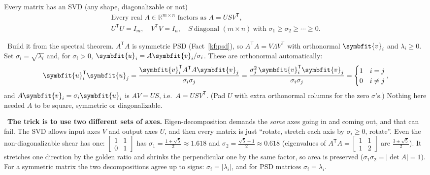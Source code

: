 \documentclass[11pt]{article}
\newcommand{\bm}[1]{\symbfit{#1}}
\newcounter{keyfact}
\newcommand{\why}{\par\smallskip{\color{intgreen}\textbf{Why.}}\ }
\newcommand{\sowhat}{\par\smallskip{\color{corpurple}\textbf{So what.}}\ }
\newcommand{\R}{\mathbb{R}}
\newcommand{\T}{^{\mathsf T}}
\begin{document}
\begin{keyfactbox}{Every matrix has an SVD (any shape, diagonalizable or not)}\label{kf:svdexists}
\[
\boxed{\begin{gathered}
\text{Every real } A\in\R^{m\times n}\text{ factors as } A=USV\T,\\
U\T U=I_m,\quad V\T V=I_n,\quad S\ \text{diagonal } (m\times n)\ \text{with }\sigma_1\ge\sigma_2\ge\cdots\ge0.
\end{gathered}}
\]
\why Build it from the spectral theorem. $A\T A$ is symmetric PSD (Fact~\ref{kf:psd}), so $A\T A=V\Lambda V\T$ with
orthonormal $\bm v_i$ and $\lambda_i\ge0$. Set $\sigma_i=\sqrt{\lambda_i}$ and, for $\sigma_i>0$, $\bm u_i=A\bm v_i/\sigma_i$. These are
orthonormal automatically:
\[
\bm u_i\T\bm u_j=\frac{\bm v_i\T A\T A\bm v_j}{\sigma_i\sigma_j}=\frac{\sigma_j^2\,\bm v_i\T\bm v_j}{\sigma_i\sigma_j}=\begin{cases}1&i=j\\0&i\ne j\end{cases},
\]
and $A\bm v_i=\sigma_i\bm u_i$ is $AV=US$, i.e.\ $A=USV\T$. (Pad $U$ with extra orthonormal columns for the zero
$\sigma$'s.) Nothing here needed $A$ to be square, symmetric or diagonalizable.
\sowhat \textbf{The trick is to use two different sets of axes.} Eigen-decomposition demands the \emph{same} axes
going in and coming out, and that can fail. The SVD allows input axes $V$ and output axes $U$, and then
every matrix is just ``rotate, stretch each axis by $\sigma_i\ge0$, rotate''. Even the non-diagonalizable shear has one:
$\begin{bmatrix}1&1\\0&1\end{bmatrix}$ has $\sigma_1=\tfrac{1+\sqrt5}2\approx1.618$ and $\sigma_2=\tfrac{\sqrt5-1}2\approx0.618$ (eigenvalues of
$A\T A=\begin{bmatrix}1&1\\1&2\end{bmatrix}$ are $\tfrac{3\pm\sqrt5}2$). It stretches one direction by the golden ratio and shrinks the
perpendicular one by the same factor, so area is preserved ($\sigma_1\sigma_2=|\det A|=1$). For a symmetric
matrix the two decompositions agree up to signs: $\sigma_i=|\lambda_i|$, and for PSD matrices $\sigma_i=\lambda_i$.
\end{keyfactbox}
\end{document}
